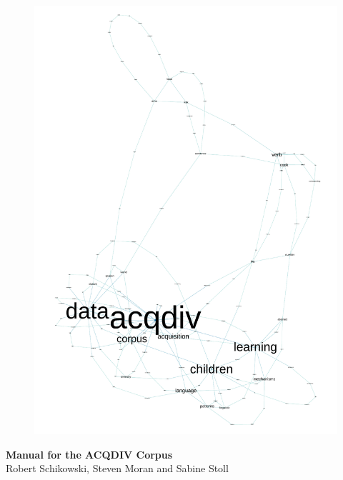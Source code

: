 \documentclass[a4paper, 11pt]{book}
\begin{document}


\begin{center}
	
	\begin{figure}[h!]
		\vspace{2.4cm}
		\includegraphics[scale=0.8]{pics/acqdivgraph.pdf}
		\vspace{0.5cm}
	\end{figure}

	\Huge{\textbf{Manual for the ACQDIV Corpus}\\[0.5cm]}
	\LARGE{Robert Schikowski, Steven Moran and Sabine Stoll}

\end{center}
\end{document}
